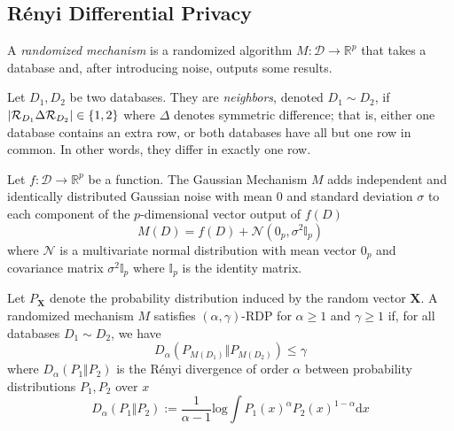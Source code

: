 \documentclass[manuscript,screen,review,anonymous]{acmart}
\DeclarePairedDelimiter{\set}{\{}{\}}
\DeclarePairedDelimiter{\abs}{\lvert}{\rvert}
\renewcommand{\implies}{\rightarrow}
\newcommand{\db}{D}
\newcommand{\dbs}{\mathcal{D}}
\newcommand{\prob}[1]{\text{Pr}[#1]}
\begin{document}
\subsection{R\'enyi Differential Privacy}


A \emph{randomized mechanism} is a randomized algorithm $M : \dbs \implies \mathbb{R}^p$ that takes a database and, after introducing noise, outputs some results.

Let $\db_1,\db_2$ be two databases. They are \emph{neighbors}, denoted $\db_1 \sim \db_2$, if $\abs{\mathcal{R}_{\db_1} \Delta \mathcal{R}_{\db_2}} \in \set{1,2}$ where $\Delta$ denotes symmetric difference; that is, either one database contains an extra row, or both databases have all but one row in common. In other words, they differ in exactly one row.

\begin{definition}\label{def:gm}
Let $f : \dbs \implies \mathbb{R}^p$ be a function. The Gaussian Mechanism $M$ adds independent and identically distributed Gaussian noise with mean $0$ and standard deviation $\sigma$ to each component of the $p$-dimensional vector output of $f(\db)$
\[
M(\db) = f(\db) + \mathcal{N}(0_p, \sigma^2 \mathbb{I}_p)
\]
where $\mathcal{N}$ is a multivariate normal distribution with mean vector $0_p$ and covariance matrix $\sigma^2 \mathbb{I}_p$ where $\mathbb{I}_p$ is the identity matrix.
\end{definition}

\begin{definition}\label{def:rdp}
Let $P_{\mathbf{X}}$ denote the probability distribution induced by the random vector $\mathbf{X}$. A randomized mechanism $M$ satisfies $(\alpha,\gamma)$-RDP for $\alpha \geq 1$ and $\gamma \geq 1$ if, for all databases $\db_1 \sim \db_2$, we have
\[
D_\alpha(P_{M(\db_1)} \Vert P_{M(\db_2)}) \leq \gamma
\]
where $D_\alpha(P_1 \Vert P_2)$ is the R\'enyi divergence\cite{van2014renyi,van2010renyi,li2016renyi} of order $\alpha$ between probability distributions $P_1,P_2$ over $x$
\[
D_\alpha(P_1 \Vert P_2) := \frac{1}{\alpha - 1} \text{log} \int {P_1(x)}^\alpha {P_2(x)}^{1-\alpha} \text{d}x
\]
\end{definition}
\end{document}
